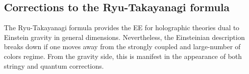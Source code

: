 \documentclass[twocolumn]{revtex4}
\providecommand{\eq}[2]{
    \begin{equation}
        #2
    \label{eq:#1}
    \end{equation}
}
\begin{document}



\subsection{Corrections to the Ryu-Takayanagi formula} \label{ss:EE_HO}

The Ryu-Takayanagi formula provides the EE for holographic theories dual to Einstein gravity in general dimensions. Nevertheless, the Einsteinian description breaks down if one moves away from the strongly coupled and large-number of colors regime. From the gravity side, this is manifest in the appearance of both stringy and quantum corrections. %
\end{document}
